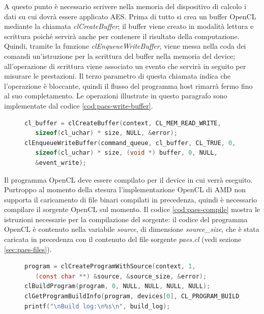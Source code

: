 \documentclass[12pt,a4paper,oneside]{book}
\begin{document}
A questo punto è necessario scrivere nella memoria del dispositivo di calcolo i dati su cui dovrà essere applicato \ac{AES}. Prima di tutto si crea un buffer \ac{OpenCL} mediante la chiamata \textit{clCreateBuffer}; il buffer viene creato in modalità lettura e scrittura poiché servirà anche per contenere il risultato della computazione. Quindi, tramite la funzione \textit{clEnqueueWriteBuffer}, viene messa nella coda dei comandi un'istruzione per la scrittura del buffer nella memoria del device; all'operazione di scrittura viene associato un evento che servirà in seguito per misurare le prestazioni. Il terzo parametro di questa chiamata indica che l'operazione è bloccante, quindi il flusso del programma host rimarrà fermo fino al suo completamento. Le operazioni illustrate in questo paragrafo sono implementate dal codice \ref{cod:paes-write-buffer}.

\begin{figure}
\begin{lstlisting}[caption={\textit{Creazione e scrittura del buffer nella memoria del dispositivo.}},label={cod:paes-write-buffer},language=C]
cl_buffer = clCreateBuffer(context, CL_MEM_READ_WRITE,
   sizeof(cl_uchar) * size, NULL, &error);
clEnqueueWriteBuffer(command_queue, cl_buffer, CL_TRUE, 0, 
   sizeof(cl_uchar) * size, (void *) buffer, 0, NULL,
   &event_write);
\end{lstlisting}
\end{figure}

Il programma \ac{OpenCL} deve essere compilato per il device in cui verrà eseguito. Purtroppo al momento della stesura l'implementazione \ac{OpenCL} di AMD non supporta il caricamento di file binari compilati in precedenza, quindi è necessario compilare il sorgente \ac{OpenCL} sul momento. Il codice \ref{cod:paes-compile} mostra le istruzioni necessarie per la compilazione del sorgente: il codice del programma \ac{OpenCL} è contenuto nella variabile \textit{source}, di dimensione \textit{source\_size}, che è stata caricata in precedenza con il contenuto del file sorgente \textit{paes.cl} (vedi sezione \ref{sec:paes-files}).

\begin{figure}
\begin{lstlisting}[caption={\textit{Compilazione del programma da eseguire sul dispositivo.}},label={cod:paes-compile},language=C]
program = clCreateProgramWithSource(context, 1,
   (const char **) &source, &source_size, &error);
clBuildProgram(program, 0, NULL, NULL, NULL, NULL);
clGetProgramBuildInfo(program, devices[0], CL_PROGRAM_BUILD_LOG, 300, build_log, NULL);
printf("\nBuild log:\n%s\n", build_log);
\end{lstlisting}
\end{figure}
\end{document}
